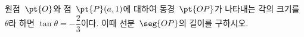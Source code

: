 원점~$\pt{O}$와 점~$\pt{P}(a{,}\mkern3mu\mathopen{}1)$에 대하여 동경~$\pt{OP}$가 나타내는 각의 크기를 $\theta$라 하면 $\tan\theta=-\dfrac{2}{3}$이다. 이때 선분~$\seg{OP}$의 길이를 구하시오.

